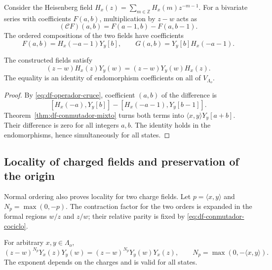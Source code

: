 
Consider the Heisenberg field \(H_x(z)=\sum_{m\in\mathbb Z}H_x(m)z^{-m-1}\). For a bivariate series with coefficients \(F(a,b)\), multiplication by \(z-w\) acts as
\begin{equation}
 (\mathcal C F)(a,b)=F(a-1,b)-F(a,b-1).
 \label{eq:df-operador-cruce}
\end{equation}
The ordered compositions of the two fields have coefficients
\[
 F(a,b)=H_x(-a-1)Y_y[b],\qquad
 G(a,b)=Y_y[b]H_x(-a-1).
\]

\begin{theorem}
\label{thm:df-localidad-mixta} The constructed fields satisfy
\begin{equation}
 (z-w)H_x(z)Y_y(w)=(z-w)Y_y(w)H_x(z).
 \label{eq:df-localidad-mixta}
\end{equation}
The equality is an identity of endomorphism coefficients on all of \(V_{\Lambda_o}\).
\end{theorem}

\begin{proof}
By \eqref{eq:df-operador-cruce}, coefficient \((a,b)\) of the difference is
\[
 [H_x(-a),Y_y[b]]-[H_x(-a-1),Y_y[b-1]].
\]
Theorem~\ref{thm:df-conmutador-mixto} turns both terms into \(\langle x,y\rangle Y_y[a+b]\). Their difference is zero for all integers \(a,b\). The identity holds in the endomorphisms, hence simultaneously for all states.
\end{proof}

\subsection{Locality of charged fields and preservation of the origin}
\label{subsec:df-localidad-cargada}


Normal ordering also proves locality for two charge fields. Let \(p=\langle x,y\rangle\) and \(N_p=\max(0,-p)\). The contraction factor for the two orders is expanded in the formal regions \(w/z\) and \(z/w\); their relative parity is fixed by \eqref{eq:df-conmutador-cociclo}.

\begin{theorem}
\label{thm:df-localidad-cargada}
For arbitrary \(x,y\in\Lambda_o\),
\begin{equation}
 (z-w)^{N_p}Y_x(z)Y_y(w)
 =(z-w)^{N_p}Y_y(w)Y_x(z),
 \qquad N_p=\max(0,-\langle x,y\rangle).
 \label{eq:df-localidad-cargada}
\end{equation}
The exponent depends on the charges and is valid for all states.
\end{theorem}

